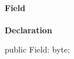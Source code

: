 \documentclass{report}
\begin{document}
\paragraph*{Field}\hspace*{\fill}

\begin{list}{}{
\setlength{\itemindent}{0cm}
\setlength{\listparindent}{0cm}
\setlength{\leftmargin}{\evensidemargin}
\addtolength{\leftmargin}{\tmplength}
\settowidth{\labelsep}{X}
\addtolength{\leftmargin}{\labelsep}
\setlength{\labelwidth}{\tmplength}
}
\begin{flushleft}
\item[\textbf{Declaration}\hfill]
\begin{ttfamily}
public Field: byte;\end{ttfamily}


\end{flushleft}
\end{list}
\end{document}
